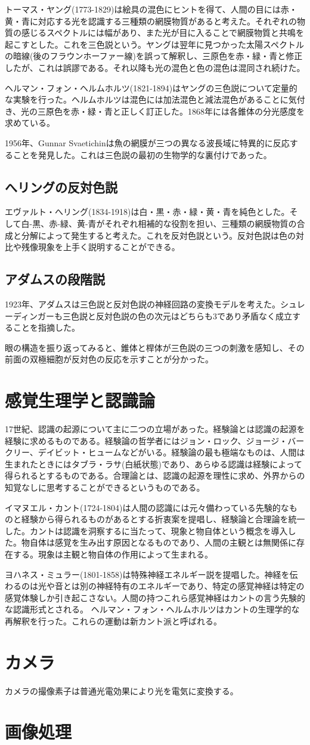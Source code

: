 		トーマス・ヤング(1773-1829)は絵具の混色にヒントを得て、人間の目には赤・黄・青に対応する光を認識する三種類の網膜物質があると考えた。それぞれの物質の感じるスペクトルには幅があり、また光が目に入ることで網膜物質と共鳴を起こすとした。これを三色説という。ヤングは翌年に見つかった太陽スペクトルの暗線(後のフラウンホーファー線)を誤って解釈し、三原色を赤・緑・青と修正したが、これは誤謬である。それ以降も光の混色と色の混色は混同され続けた。

		ヘルマン・フォン・ヘルムホルツ(1821-1894)はヤングの三色説について定量的な実験を行った。ヘルムホルツは混色には加法混色と減法混色があることに気付き、光の三原色を赤・緑・青と正しく訂正した。1868年には各錐体の分光感度を求めている。

		1956年、Gunnar Svaetichinは魚の網膜が三つの異なる波長域に特異的に反応することを発見した。これは三色説の最初の生物学的な裏付けであった。
	\subsection{へリングの反対色説}
		エヴァルト・へリング(1834-1918)は白・黒・赤・緑・黄・青を純色とした。そして白-黒、赤-緑、黄-青がそれぞれ相補的な役割を担い、三種類の網膜物質の合成と分解によって発生すると考えた。これを反対色説という。反対色説は色の対比や残像現象を上手く説明することができる。
	\subsection{アダムスの段階説}
		1923年、アダムスは三色説と反対色説の神経回路の変換モデルを考えた。シュレーディンガーも三色説と反対色説の色の次元はどちらも3であり矛盾なく成立することを指摘した。
		
		眼の構造を振り返ってみると、錐体と桿体が三色説の三つの刺激を感知し、その前面の双極細胞が反対色の反応を示すことが分かった。

\section{感覚生理学と認識論}
	17世紀、認識の起源について主に二つの立場があった。経験論とは認識の起源を経験に求めるものである。経験論の哲学者にはジョン・ロック、ジョージ・バークリー、デイビット・ヒュームなどがいる。経験論の最も極端なものは、人間は生まれたときにはタブラ・ラサ(白紙状態)であり、あらゆる認識は経験によって得られるとするものである。合理論とは、認識の起源を理性に求め、外界からの知覚なしに思考することができるというものである。

	イマヌエル・カント(1724-1804)は人間の認識には元々備わっている先験的なものと経験から得られるものがあるとする折衷案を提唱し、経験論と合理論を統一した。カントは認識を洞察するに当たって、現象と物自体という概念を導入した。物自体は感覚を生み出す原因となるものであり、人間の主観とは無関係に存在する。現象は主観と物自体の作用によって生まれる。

	ヨハネス・ミュラー(1801-1858)は特殊神経エネルギー説を提唱した。神経を伝わるのは光や音とは別の神経特有のエネルギーであり、特定の感覚神経は特定の感覚体験しか引き起こさない。人間の持つこれら感覚神経はカントの言う先験的な認識形式とされる。
	ヘルマン・フォン・ヘルムホルツはカントの生理学的な再解釈を行った。これらの運動は新カント派と呼ばれる。
\section{カメラ}
	カメラの撮像素子は普通光電効果により光を電気に変換する。
\section{画像処理}